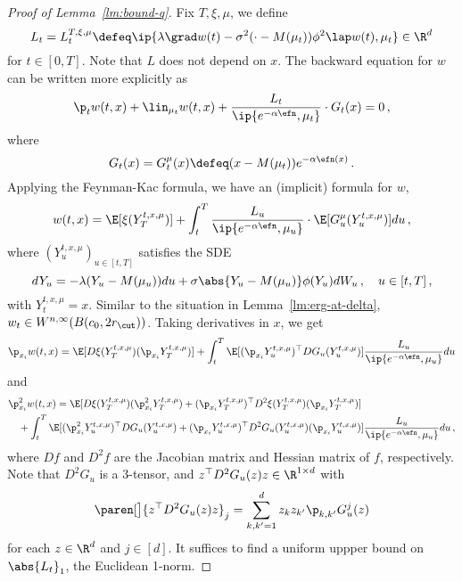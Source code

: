 \documentclass{amsart}
\begin{document}
\begin{proof}[Proof of Lemma~\ref{lm:bound-q}]
	\step[Recurrence of $w$]
	Fix $T, \xi, \mu$, we define 
	\begin{equation*}
		L_t = L^{T,\xi,\mu}_t \defeq \ip{\lambda \grad w(t) - \sigma^2 (\cdot-M(\mu_t)) \phi^2 \lap w(t), \mu_t } \in \R^d
	\end{equation*}
	for $t \in [0,T]$. 
	Note that $L$ does not depend on $x$. 
	The backward equation for $w$ can be written more explicitly as 
	\begin{equation*}
		\p_t w(t,x) + \lin_{\mu_t} w(t,x) + \frac{L_t}{\ip{e^{-\alpha\efn},\mu_t}} \cdot G_t(x) = 0 \,,
	\end{equation*}
	where 
	\begin{equation*}
		G_t(x) = G^\mu_t(x) \defeq (x-M(\mu_t)) e^{-\alpha \efn(x)} \,.
	\end{equation*}
	Applying the Feynman-Kac formula, we have an (implicit) formula for $w$,
	\begin{equation*}
		w(t,x) = \E [\xi(Y^{t,x,\mu}_T)] + \int_t^T \frac{L_u}{\ip{e^{-\alpha\efn},\mu_u}} \cdot \E [G^\mu_u(Y^{t,x,\mu}_u)] du \,,
	\end{equation*}
	where $(Y^{t,x,\mu}_u)_{u \in [t,T]}$ satisfies the SDE 
	\begin{equation*}
		d Y_u = -\lambda (Y_u - M(\mu_u)) du + \sigma \abs{Y_u - M(\mu_u)} \phi(Y_u) dW_u \,, \quad u \in [t,T] \,,
	\end{equation*}
	with $Y^{t,x,\mu}_t = x$. 
    Similar to the situation in Lemma~\ref{lm:erg-at-delta}, $w_t \in W^{n,\infty}(B(c_0, 2r_\cut))$.
	Taking derivatives in $x$, we get 
	\begin{equation*}
		\p_{x_i} w(t,x) = \E [D\xi(Y^{t,x,\mu}_T) (\p_{x_i} Y^{t,x,\mu}_T)] + \int_t^T \E [(\p_{x_i} Y^{t,x,\mu}_u)^\top D G_u(Y^{t,x,\mu}_u)] \frac{L_u}{\ip{e^{-\alpha\efn}, \mu_u}} du 
	\end{equation*}
	and 
	\begin{align*}
		& \p_{x_i}^2 w(t,x) = \E [D\xi(Y^{t,x,\mu}_T) (\p_{x_i}^2 Y^{t,x,\mu}_T) + (\p_{x_i} Y^{t,x,\mu}_T)^\top D^2 \xi(Y^{t,x,\mu}_T) (\p_{x_i} Y^{t,x,\mu}_T)] \\
		& \quad + \int_t^T \E [ (\p_{x_i}^2 Y^{t,x,\mu}_u)^\top D G_u(Y^{t,x,\mu}_u) + (\p_{x_i} Y^{t,x,\mu}_u)^\top D^2 G_u(Y^{t,x,\mu}_u) (\p_{x_i} Y^{t,x,\mu}_u) ] \frac{L_u}{\ip{e^{-\alpha\efn}, \mu_u}} du \,,
	\end{align*}
	where $Df$ and $D^2f$ are the Jacobian matrix and Hessian matrix of $f$, respectively.
	Note that $D^2 G_u$ is a 3-tensor, and $z^\top D^2 G_u(z) z \in \R^{1 \times d}$ with 
	\begin{equation*}
		\paren[\big]{z^\top D^2 G_u(z) z}_j = \sum_{k,k'=1}^d z_k z_{k'} \p_{k,k'} G^j_u(z)
	\end{equation*}
	for each $z \in \R^d$ and $j \in [d]$.
	It suffices to find a uniform uppper bound on $\abs{L_t}_1$, the Euclidean 1-norm.


\end{proof}
\end{document}

